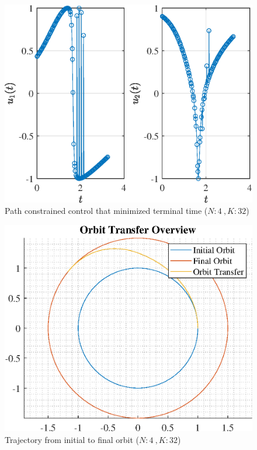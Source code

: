 \documentclass[]{article}
\begin{document}
\begin{figure}
	\centering
	\includegraphics[scale=0.75]{path_N4_K32_C3_tf.eps}
	\caption{Path constrained control that minimized terminal time (\(N:4\ , K:32\))}
	\label{fig:path_N4_K32_C3_tf}
\end{figure}
\begin{figure}
	\centering
	\includegraphics[scale=0.75]{orbit_N4_K32_C3_tf.eps}
	\caption{Trajectory from initial to final orbit (\(N:4\ , K:32\))}
	\label{fig:orbit_N4_K32_C3_tf}
\end{figure}
\end{document}
